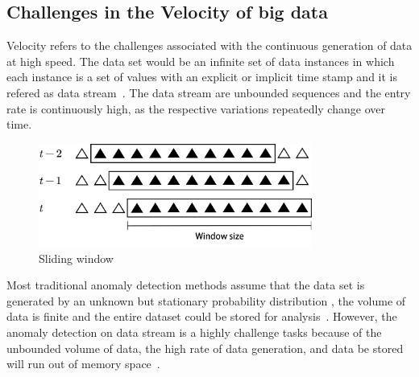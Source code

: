 \subsection{Challenges in the Velocity of big data}

Velocity refers to the challenges associated with
the continuous generation of data at
high speed.
The data set would be
an infinite set of data instances in which
each instance is a
set of values with an explicit or
implicit time stamp
and it is refered as data stream~\cite{sadik2014research}.
The data stream are unbounded
sequences and the entry rate is continuously high,
as the respective variations repeatedly
change over time.

\begin{figure}
  \centering
  \includegraphics[width=0.8\textwidth]{figures/slideWindow.png}
  \caption{Sliding window}\label{fig:slidingWindow}
\end{figure}

Most traditional anomaly detection methods assume that
the data set is generated
by an unknown but stationary probability distribution
,
the volume of data is finite and
the entire dataset could be stored for analysis~\cite{silva2013data}.
However,
the anomaly detection on data stream is
a highly challenge tasks because of
the unbounded volume of data,
the high rate of data generation,
and data be stored will run out of memory space~\cite{sadik2014research}.

